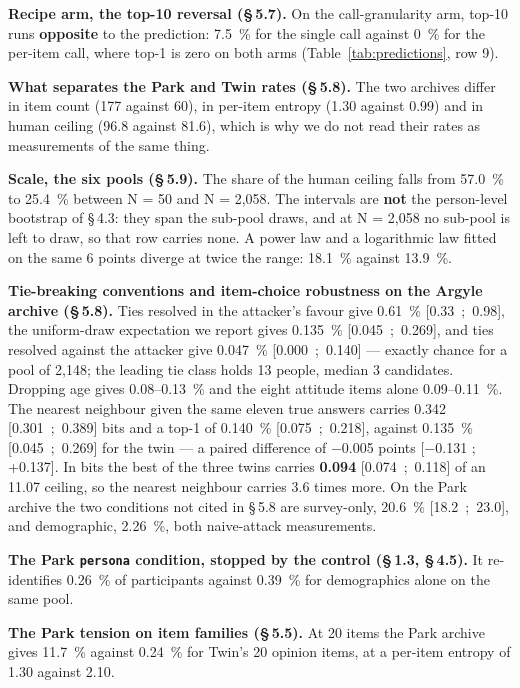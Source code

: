 \documentclass[sigconf,anonymous,review]{acmart}
\begin{document}
\textbf{Recipe arm, the top-10 reversal (\S\,5.7).} On the call-granularity arm, top-10 runs \textbf{opposite} to the prediction: 7.5~\% for the single call against 0~\% for the per-item call, where top-1 is zero on both arms (Table~\ref{tab:predictions}, row 9).

\textbf{What separates the Park and Twin rates (\S\,5.8).} The two archives differ in item count (177 against 60), in per-item entropy (1.30 against 0.99) and in human ceiling (96.8 against 81.6), which is why we do not read their rates as measurements of the same thing.

\textbf{Scale, the six pools (\S\,5.9).} The share of the human ceiling falls from 57.0~\% to 25.4~\% between N = 50 and N = 2,058. The intervals are \textbf{not} the person-level bootstrap of \S\,4.3: they span the sub-pool draws, and at N = 2,058 no sub-pool is left to draw, so that row carries none. A power law and a logarithmic law fitted on the same 6 points diverge at twice the range: 18.1~\% against 13.9~\%.

\textbf{Tie-breaking conventions and item-choice robustness on the Argyle archive (\S\,5.8).} Ties resolved in the attacker's favour give 0.61~\% [0.33~;~0.98], the uniform-draw expectation we report gives 0.135~\% [0.045~;~0.269], and ties resolved against the attacker give 0.047~\% [0.000~;~0.140] --- exactly chance for a pool of 2,148; the leading tie class holds 13 people, median 3 candidates. Dropping age gives 0.08--0.13~\% and the eight attitude items alone 0.09--0.11~\%. The nearest neighbour given the same eleven true answers carries 0.342 [0.301~;~0.389] bits and a top-1 of 0.140~\% [0.075~;~0.218], against 0.135~\% [0.045~;~0.269] for the twin --- a paired difference of $-0$.005 points [$-0$.131 ; +0.137]. In bits the best of the three twins carries \textbf{0.094} [0.074~;~0.118] of an 11.07 ceiling, so the nearest neighbour carries 3.6 times more. On the Park archive the two conditions not cited in \S\,5.8 are survey-only, 20.6~\% [18.2~;~23.0], and demographic, 2.26~\%, both naive-attack measurements.

\textbf{The Park \texttt{persona} condition, stopped by the control (\S\,1.3, \S\,4.5).} It re-identifies 0.26~\% of participants against 0.39~\% for demographics alone on the same pool.

\textbf{The Park tension on item families (\S\,5.5).} At 20 items the Park archive gives 11.7~\% against 0.24~\% for Twin's 20 opinion items, at a per-item entropy of 1.30 against 2.10.
\end{document}
